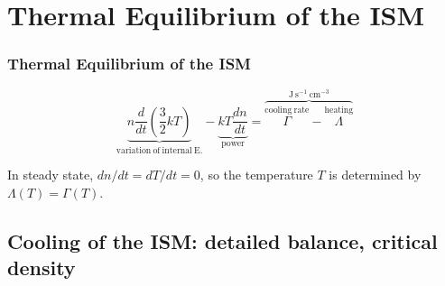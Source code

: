 %
%
%

\section{Thermal Equilibrium of the ISM}

 \begin{frame}\frametitle{Thermal Equilibrium of the ISM}



\centering

\[  \underbrace{n \frac{d}{dt} \left( \frac{3}{2} k T
  \right)}_{\mathrm{variation ~of ~ internal ~E.}} -
\underbrace{kT\frac{dn}{dt}}_{\mathrm{power}}
 = \overbrace{
\stackrel{\mathrm{cooling ~rate}}{\Gamma}  -
\stackrel{\mathrm{heating}}{\Lambda}}^{\mathrm{J~s^{-1}~cm^{-3}}}\]

\raggedright
In steady state, $dn/dt = dT/dt = 0$, so the temperature $T$
is determined by  $\Lambda(T)  = \Gamma(T) $.


\end{frame}

\subsection{Cooling of the ISM: detailed balance, critical density}


